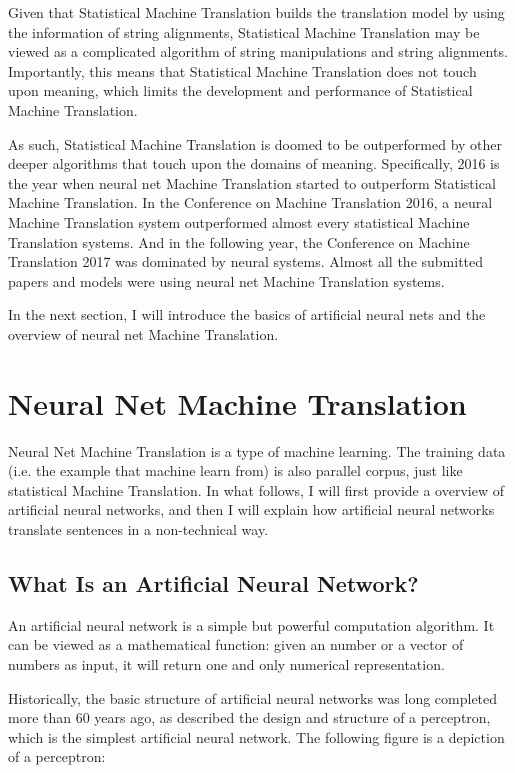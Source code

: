 Given that Statistical Machine Translation builds the translation model by using the information of string alignments, Statistical Machine Translation may be viewed as a complicated algorithm of string manipulations and string alignments. 
Importantly, this means that Statistical Machine Translation does not touch upon meaning, which limits the development and performance of Statistical Machine Translation. 

As such, Statistical Machine Translation is doomed to be outperformed by other deeper algorithms that touch upon the domains of meaning. Specifically, 2016 is the year when neural net Machine Translation started to outperform Statistical Machine Translation. In the Conference on Machine Translation 2016, a neural Machine Translation system outperformed almost every statistical Machine Translation systems. And in the following year, the Conference on Machine Translation 2017 was dominated by neural systems. Almost all the submitted papers and models were using neural net Machine Translation systems. 

In the next section, I will introduce the basics of artificial neural nets and the overview of neural net Machine Translation.  

\section{Neural Net Machine Translation}\label{neural_MT}

Neural Net Machine Translation is a type of machine learning. The training data (i.e. the example that machine learn from) is also parallel corpus, just like statistical Machine Translation. 
In what follows, I will first provide a overview of artificial neural networks, and then I will explain how artificial neural networks translate sentences in a non-technical way.

\subsection{What Is an Artificial Neural Network?}

An artificial neural network is a simple but powerful computation algorithm. It can be viewed as a mathematical function: given an number or a vector of numbers as input, it will return one and only numerical representation. 

Historically, the basic structure of artificial neural networks was long completed more than 60 years ago, 
as \citet{rosenblatt} described the design and structure of a perceptron, which is the simplest artificial neural network. The following figure is a depiction of a perceptron: 

